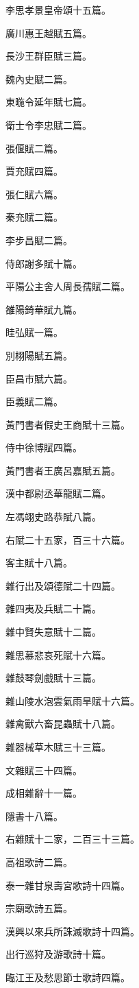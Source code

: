 \begin{pinyinscope}
李思孝景皇帝頌十五篇。

廣川惠王越賦五篇。

長沙王群臣賦三篇。

魏內史賦二篇。

東暆令延年賦七篇。

衛士令李忠賦二篇。

張偃賦二篇。

賈充賦四篇。

張仁賦六篇。

秦充賦二篇。

李步昌賦二篇。

侍郎謝多賦十篇。

平陽公主舍人周長孺賦二篇。

雒陽錡華賦九篇。

眭弘賦一篇。

別栩陽賦五篇。

臣昌市賦六篇。

臣義賦二篇。

黃門書者假史王商賦十三篇。

侍中徐博賦四篇。

黃門書者王廣呂嘉賦五篇。

漢中都尉丞華龍賦二篇。

左馮翊史路恭賦八篇。

右賦二十五家，百三十六篇。

客主賦十八篇。

雜行出及頌德賦二十四篇。

雜四夷及兵賦二十篇。

雜中賢失意賦十二篇。

雜思慕悲哀死賦十六篇。

雜鼓琴劍戲賦十三篇。

雜山陵水泡雲氣雨旱賦十六篇。

雜禽獸六畜昆蟲賦十八篇。

雜器械草木賦三十三篇。

文雜賦三十四篇。

成相雜辭十一篇。

隱書十八篇。

右雜賦十二家，二百三十三篇。

高祖歌詩二篇。

泰一雜甘泉壽宮歌詩十四篇。

宗廟歌詩五篇。

漢興以來兵所誅滅歌詩十四篇。

出行巡狩及游歌詩十篇。

臨江王及愁思節士歌詩四篇。


\end{pinyinscope}
